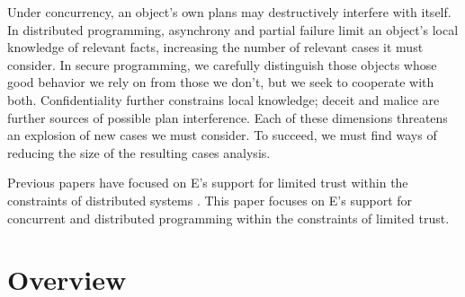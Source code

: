 \documentclass{llncs}
\begin{document}
Under concurrency, an object's own plans may destructively interfere
with itself. In distributed programming, asynchrony and partial
failure limit an object's local knowledge of relevant facts,
increasing the number of relevant cases it must consider. In secure
programming, we carefully distinguish those objects whose good
behavior we rely on from those we don't, but we seek to cooperate with
both. Confidentiality further constrains local knowledge; deceit and
malice are further sources of possible plan interference. Each of
these dimensions threatens an explosion of new cases we must
consider. To succeed, we must find ways of reducing the size of the
resulting cases analysis.

Previous papers have focused on E's support for limited trust within
the constraints of distributed systems
\cite{miller:ode,miller:myths,miller:paradigm,miller:struct-auth}. This
paper focuses on E's support for concurrent and distributed
programming within the constraints of limited trust.

\section{Overview}
\end{document}
